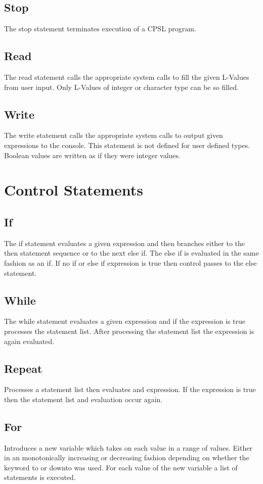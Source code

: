 \documentclass{book}
\begin{document}
\subsection{Stop}
The stop statement terminates execution of a CPSL program.
\subsection{Read}
The read statement calls the appropriate system calls to fill the given L-Values from user input.  Only L-Values of integer or character type can be so filled.
\subsection{Write}
The write statement calls the appropriate system calls to output given expressions to the console.
This statement is not defined for user defined types.
Boolean values are written as if they were integer values.
\section{Control Statements}
\subsection{If}
The if statement evaluates a given expression and then branches either to the then statement sequence or to the next else if.
The else if is evaluated in the same fashion as an if.
If no if or else if expression is true then control passes to the else statement.
\subsection{While}
The while statement evaluates a given expression and if the expression is true processes the statement list.
After processing the statement list the expression is again evaluated.
\subsection{Repeat}
Processes a statement list then evaluates and expression.  If the expression is true then the statement list and evaluation occur again.
\subsection{For}
Introduces a new variable which takes on each value in a range of values.
Either in an monotonically increasing or decreasing fashion depending on whether the keyword to or downto was used.  For each value of the new variable a list of statements is executed.
\end{document}
